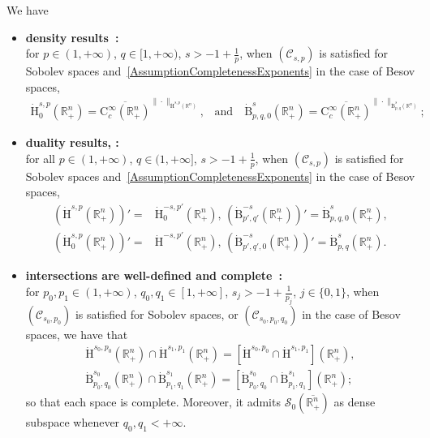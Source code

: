 \documentclass[10pt]{amsart}
\theoremstyle{definition}\newtheorem{defi}[theo]{Definition}\newtheorem{rema}[theo]{Remark}\newtheorem{exam}[theo]{Example}\newtheorem{exem}[theo]{Example}\newtheorem{nota}[theo]{Notation}
\newcommand{\bbR}{\mathbb{R}}
\newcommand{\rmH}{\mathrm{H}}%
\newcommand{\rmB}{\mathrm{B}}
\newcommand{\rmC}{\mathrm{C}}
\newcommand{\clC}{\mathcal{C}}
\newcommand{\clS}{\mathcal{S}}
\begin{document}
We have
\begin{itemize}
\item \textbf{density results~\cite[Proposition~3.9, Corollary~3.12]{Gaudin2022}:}\\
for $p\in(1,+\infty)$, $q\in[1,+\infty)$, $s>-1+\frac{1}{p}$, when $(\clC_{s,p})$ is satisfied for Sobolev spaces and~\eqref{AssumptionCompletenessExponents} in the case of Besov spaces,
\begin{align}
\dot{\rmH}^{s,p}_0\left(\bbR^n_+\right)= \overline{\rmC _c^\infty\left(\bbR^n_+\right)}^{\| \cdot \|_{\dot{\rmH}^{s,p}\left(\bbR^n\right)}}\text{,}\quad\text{and}\quad \dot{\rmB}^{s}_{p,q,0}\left(\bbR^n_+\right)= \overline{\rmC _c^\infty\left(\bbR^n_+\right)}^{\| \cdot \|_{\dot{\rmB}^{s}_{p,q}\left(\bbR^n\right)}};
\end{align}
\item \textbf{duality results, \cite[Propositions~3.11~\&~3.23]{Gaudin2022}:}\\
for all $p\in(1,+\infty)$, $q\in(1,+\infty]$, $s>-1+\tfrac{1}{p}$, when $(\clC_{s,p})$ is satisfied for Sobolev spaces and~\eqref{AssumptionCompletenessExponents} in the case of Besov spaces,
\begin{align}
\left(\dot{\rmH}^{s,p}\left(\bbR^n_+\right)\right)' = &\dot{\rmH}^{-s,p'}_0\left(\bbR^n_+\right),\, \left(\dot{\rmB}^{-s}_{p',q'}\left(\bbR^n_+\right)\right)'=\dot{\rmB}^{s}_{p,q,0}\left(\bbR^n_+\right),\\
\left(\dot{\rmH}^{s,p}_0\left(\bbR^n_+\right)\right)' = &\dot{\rmH}^{-s,p'}\left(\bbR^n_+\right),\,\left(\dot{\rmB}^{-s}_{p',q',0}\left(\bbR^n_+\right)\right)'=\dot{\rmB}^{s}_{p,q}\left(\bbR^n_+\right).
\end{align}
\item \textbf{intersections are well-defined and complete~\cite[Lemma~2.5, Proposition~3.3, Proposition~3.20]{Gaudin2022}:}\\
for $p_0,p_1\in(1,+\infty)$, $q_0,q_1\in[1,+\infty]$, $s_j>-1+\frac{1}{p_j}$, $j\in\{0,1\}$, when $(\clC_{s_0,p_0})$ is satisfied for Sobolev spaces, or $(\clC_{s_0,p_0,q_0})$ in the case of Besov spaces, we have that
\begin{align}
\dot{\rmH}^{s_0,p_0}\left(\bbR^n_+\right)\cap\dot{\rmH}^{s_1,p_1}\left(\bbR^n_+\right)= [\dot{\rmH}^{s_0,p_0}\cap\dot{\rmH}^{s_1,p_1}]\left(\bbR^n_+\right),\\
\dot{\rmB}^{s_0}_{p_0,q_0}\left(\bbR^n_+\right)\cap\dot{\rmB}^{s_1}_{p_1,q_1}\left(\bbR^n_+\right) = \left[\dot{\rmB}^{s_0}_{p_0,q_0}\cap\dot{\rmB}^{s_1}_{p_1,q_1}\right]\left(\bbR^n_+\right);
\end{align}
so that each space is complete. Moreover, it admits $\clS_0(\overline{\bbR^n_+})$ as dense subspace whenever $q_0,q_1<+\infty$.


\end{itemize}
\end{document}
